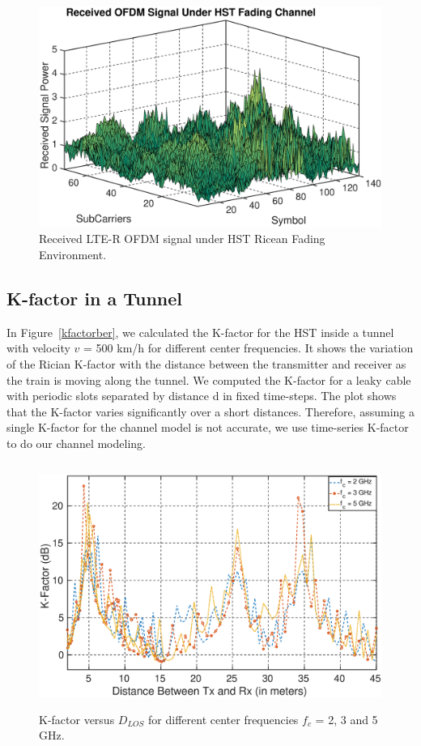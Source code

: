 \begin{figure}[!ht]
\label{lteofdma}
\centering
\includegraphics[width=\textwidth,keepaspectratio]{images/Gill/lte_figs/receivedsignal.eps} 
\caption{Received LTE-R OFDM signal under HST Ricean Fading Environment. }
\end{figure}

\subsection{K-factor in a Tunnel}
In Figure~\ref{kfactorber}, we calculated the K-factor for the HST inside a tunnel with velocity $v$ = 500 km/h for different center frequencies. It shows the variation of the Rician K-factor with the distance between the transmitter and receiver as the train is moving along the tunnel. We computed the K-factor for a leaky cable with periodic slots separated by distance d in fixed time-steps. The plot shows that the K-factor varies significantly over a short distances. Therefore, assuming a single K-factor for the channel model is not accurate, we use time-series K-factor to do our channel modeling.

\begin{figure}[!ht]
\label{kfactor}
\centering
\includegraphics[width=\textwidth,keepaspectratio,height=8cm]{images/Gill/lte_figs/kfactordist.eps} 
\caption{K-factor versus $D_{LOS}$ for different center frequencies $f_c$ = 2, 3 and 5 GHz.}
\end{figure}

